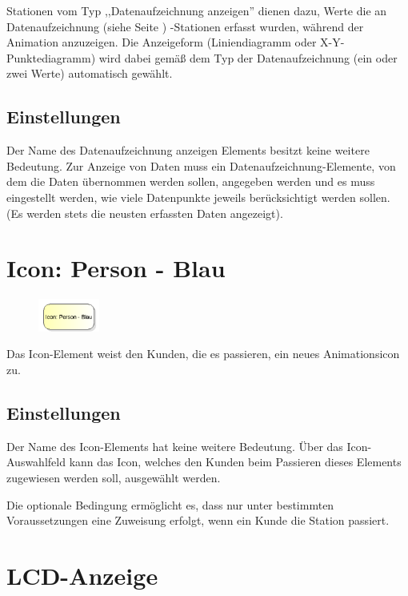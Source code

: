 Stationen vom Typ ,,Datenaufzeichnung anzeigen'' dienen dazu, Werte die an
Datenaufzeichnung (siehe Seite \pageref{ref:ModelElementRecord}) -Stationen erfasst
wurden, während der Animation anzuzeigen. Die Anzeigeform (Liniendiagramm oder
X-Y-Punktediagramm) wird dabei gemäß dem Typ der Datenaufzeichnung (ein oder zwei Werte)
automatisch gewählt.

\subsection*{Einstellungen}

Der Name des Datenaufzeichnung anzeigen Elements besitzt keine weitere Bedeutung.
Zur Anzeige von Daten muss ein Datenaufzeichnung-Elemente, von dem die Daten
übernommen werden sollen, angegeben werden und es muss eingestellt werden, wie
viele Datenpunkte jeweils berücksichtigt werden sollen. (Es werden stets die neusten
erfassten Daten angezeigt).


\section{Icon: Person - Blau}
\label{ref:ModelElementClientIcon}

\begin{figure}
\vspace{-22pt}
\includegraphics[width=2cm]{imageModelElementClientIcon.png}
\vspace{-22pt}
\end{figure}

Das Icon-Element weist den Kunden, die es passieren, ein neues Animationsicon zu.

\subsection*{Einstellungen}

Der Name des Icon-Elements hat keine weitere Bedeutung. Über das Icon-Auswahlfeld kann das Icon,
welches den Kunden beim Passieren dieses Elements zugewiesen werden soll, ausgewählt werden.

Die optionale Bedingung ermöglicht es, dass nur unter bestimmten Voraussetzungen eine Zuweisung erfolgt,
wenn ein Kunde die Station passiert.


\section{LCD-Anzeige}
\label{ref:ModelElementAnimationLCD}

